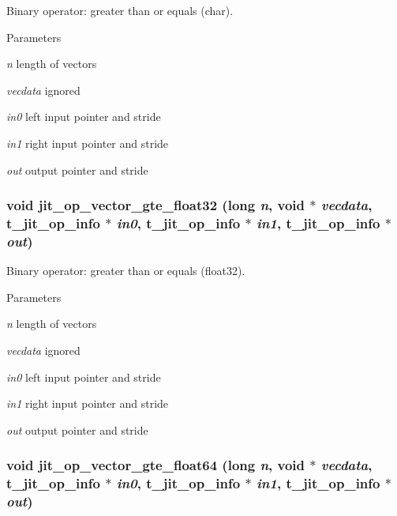 Binary operator: greater than or equals (char). 
\begin{DoxyParams}{Parameters}
\item[{\em n}]length of vectors \item[{\em vecdata}]ignored \item[{\em in0}]left input pointer and stride \item[{\em in1}]right input pointer and stride \item[{\em out}]output pointer and stride \end{DoxyParams}
\hypertarget{group__opvecmod_ga7d05b7545d222540949003a22fdb60c4}{
\subsubsection[{jit\_\-op\_\-vector\_\-gte\_\-float32}]{\setlength{\rightskip}{0pt plus 5cm}void jit\_\-op\_\-vector\_\-gte\_\-float32 (long {\em n}, \/  void $\ast$ {\em vecdata}, \/  {\bf t\_\-jit\_\-op\_\-info} $\ast$ {\em in0}, \/  {\bf t\_\-jit\_\-op\_\-info} $\ast$ {\em in1}, \/  {\bf t\_\-jit\_\-op\_\-info} $\ast$ {\em out})}}
\label{group__opvecmod_ga7d05b7545d222540949003a22fdb60c4}


Binary operator: greater than or equals (float32). 
\begin{DoxyParams}{Parameters}
\item[{\em n}]length of vectors \item[{\em vecdata}]ignored \item[{\em in0}]left input pointer and stride \item[{\em in1}]right input pointer and stride \item[{\em out}]output pointer and stride \end{DoxyParams}
\hypertarget{group__opvecmod_ga2ed64ce3dc74e0c5b3500dba435c4df6}{
\subsubsection[{jit\_\-op\_\-vector\_\-gte\_\-float64}]{\setlength{\rightskip}{0pt plus 5cm}void jit\_\-op\_\-vector\_\-gte\_\-float64 (long {\em n}, \/  void $\ast$ {\em vecdata}, \/  {\bf t\_\-jit\_\-op\_\-info} $\ast$ {\em in0}, \/  {\bf t\_\-jit\_\-op\_\-info} $\ast$ {\em in1}, \/  {\bf t\_\-jit\_\-op\_\-info} $\ast$ {\em out})}}
\label{group__opvecmod_ga2ed64ce3dc74e0c5b3500dba435c4df6}


